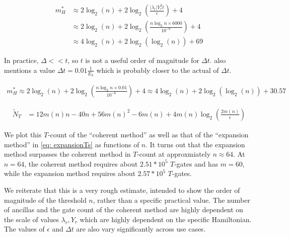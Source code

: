 \begin{equation}
    \begin{split}
        m^*_{H} &\approx 2\log_2(n) + 2\log_2\left(\frac{|\lambda_r|Y_r^2 t}{\epsilon}\right) + 4 \\
        &\approx 2\log_2(n) + 2\log_2\left(\frac{n\log_2{n}\times 6000}{10^{-6}}\right) + 4 \\
        &\approx 4\log_2(n) + 2\log_2(\log_2(n)) + 69
    \end{split}
\end{equation}

In practice, $\Delta << t$, so $t$ is not a useful order of magnitude for $\Delta t$. \cite{Gate_Count} also mentions a value $\Delta t = 0.01 \frac{1}{E_h}$ which is probably closer to the actual of $\Delta t$.

\begin{equation}
    \begin{split}
        m^*_{H} \approx 2\log_2(n) + 2\log_2\left(\frac{n\log_2{n}\times 0.01}{10^{-6}}\right) + 4 \approx 4\log_2(n) + 2\log_2(\log_2(n)) + 30.57
    \end{split}
\end{equation}

\begin{equation}
    \begin{split}
        \tilde{N}_{T} &= 12m(n)n - 40n + 56m(n)^2 - 6m(n) + 4m(n)\log_2(\frac{2m(n)}{\epsilon})
    \end{split}
\end{equation}

We plot this $T$-count of the ``coherent method'' as well as that of the ``expansion method'' in \eqref{eq: expansionTs} as functions of $n$. It turns out that the expansion method surpasses the coherent method in $T$-count at approxmiately $n \approx 64$. At $n = 64$, the coherent method requires about $2.51 * 10^5$ $T$-gates and has $m = 60$, while the expansion method requires about $2.57 * 10^5$ $T$-gates.

We reiterate that this is a very rough estimate, intended to show the order of magnitude of the threshold $n$, rather than a specific practical value. The number of ancillas and the gate count of the coherent method are highly dependent on the scale of values $\lambda_r, Y_r$ which are highly dependent on the specific Hamiltonian. The values of $\epsilon$ and $\Delta t$ are also vary significantly across use cases.

